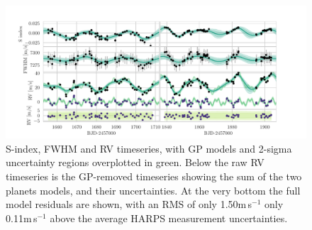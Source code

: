 \documentclass[fleqn,usenatbib]{mnras}
\newcommand{\ms}{m\,s$^{-1}$}
\begin{document}
\onecolumn
\begin{figure}
	\includegraphics[width=\textwidth]{Combined_RV_plots_3_GPs.pdf}
    \caption{S-index, FWHM and RV timeseries, with GP models and 2-sigma uncertainty regions overplotted in green. Below the raw RV timeseries is the GP-removed timeseries showing the sum of the two planets models, and their uncertainties. At the very bottom the full model residuals are shown, with an RMS of only 1.50\ms{} only 0.11\ms{} above the average HARPS measurement uncertainties.}
    \label{fig:RVs}
\end{figure}
\twocolumn
\end{document}
